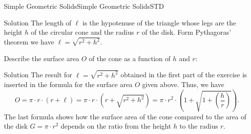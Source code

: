 \begin{MXContent}{Simple Geometric Solids}{Simple Geometric Solids}{STD}
\begin{MExercise}
\begin{MExerciseItems}
\begin{MHint}{Solution}
The length of $\ell$ is the hypotenuse of the triangle whose legs are the height
$h$ of the circular cone and the radius $r$ of the disk. Form Pythagoras' theorem
we have $\ell = \sqrt{r^2 + h^2}$.
\end{MHint}

\item
Describe the surface area $O$ of the cone as a function of $h$ and $r$:
\par

\begin{MHint}{Solution}
The result for $\ell = \sqrt{r^2 + h^2}$ obtained in the first part of the exercise is inserted 
in the formula for the surface area $O$ given above. Thus, we have
\[
O = \pi \cdot r \cdot (r + \ell) %
 = \pi \cdot r \cdot \left(r + \sqrt{r^2 + h^2}\right) %
 = \pi \cdot r^2 \cdot \left(1 + \sqrt{1 + \left(\frac{h}{r}\right)} \right). %
\]
The last formula shows how the surface area of the cone compared to 
the area of the disk $G = \pi \cdot r^2$ depends on the ratio from the height 
$h$ to the radius $r$.
\end{MHint}
\end{MExerciseItems}
\end{MExercise}

\end{MXContent}


